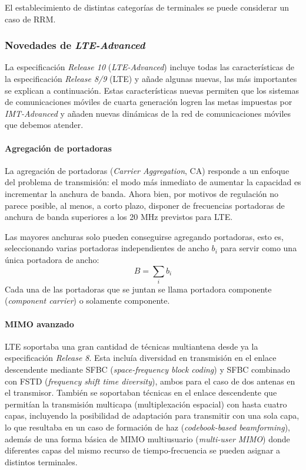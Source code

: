 \documentclass[12pt]{report} %
\begin{document}
El establecimiento de distintas categorías de terminales se puede considerar un caso de RRM.

\subsubsection{Novedades de \textit{LTE-Advanced}}

La especificación \textit{Release 10} (\textit{LTE-Advanced}) incluye todas las características de la especificación \textit{Release 8/9} (LTE) y añade algunas nuevas,
las más importantes se explican a continuación.
Estas características nuevas permiten que los sistemas de comunicaciones móviles de cuarta generación logren las metas impuestas por \textit{IMT-Advanced} y añaden nuevas dinámicas de la red de comunicaciones móviles que debemos atender.
\cite{RefWorks:39}

\paragraph{Agregación de portadoras}

La agregación de portadoras (\textit{Carrier Aggregation}, CA) responde a un enfoque del problema de transmisión:
el modo más inmediato de aumentar la capacidad es incrementar la anchura de banda. Ahora bien, por motivos de regulación no parece posible, al menos, a corto plazo, disponer de frecuencias portadoras de anchura de banda superiores a los 20 MHz previstos para LTE.
\cite{RefWorks:81, RefWorks:26}

Las mayores anchuras solo pueden conseguirse agregando portadoras, esto es, seleccionando varias portadoras independientes de ancho $b_i$ para servir como una única portadora de ancho:
$$B = \sum_i b_i$$
Cada una de las portadoras que se juntan se llama portadora componente (\textit{component carrier}) o solamente componente.
\cite{RefWorks:81, RefWorks:39}

\paragraph{MIMO avanzado}

LTE soportaba una gran cantidad de técnicas multiantena desde ya la especificación \textit{Release 8}.
Esta incluía diversidad en transmisión en el enlace descendente mediante SFBC (\textit{space-frequency block coding})
y SFBC combinado con FSTD (\textit{frequency shift time diversity}),
ambos para el caso de dos antenas en el transmisor.
También se soportaban técnicas en el enlace descendente que permitían la transmisión multicapa (multiplexación espacial) con hasta cuatro capas,
incluyendo la posibilidad de adaptación para transmitir con una sola capa, lo que resultaba en un caso de formación de haz (\textit{codebook-based beamforming}),
además de una forma básica de MIMO multiusuario (\textit{multi-user MIMO}) donde diferentes capas del mismo recurso de tiempo-frecuencia se pueden asignar a distintos terminales.
\cite{RefWorks:39, RefWorks:26}
\end{document}
